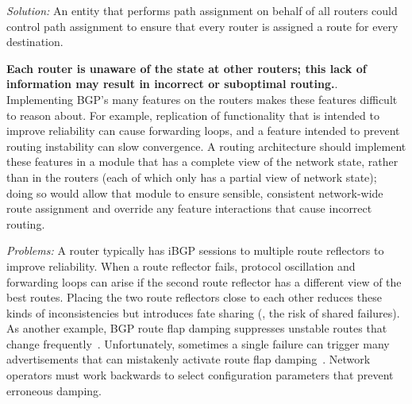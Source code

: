 \vspace{0.05in}
\noindent
{\em Solution:} 
An entity that performs path assignment on behalf of all
routers could control path assignment to ensure that every router is
assigned a route for every destination.
\vspace{0.05in}

{\bf Each router is unaware of the state at other routers; this lack of
  information may result in incorrect or suboptimal routing.}.
  Implementing BGP's many features on the routers makes these features
  difficult to reason about.  For example, replication of functionality
  that is intended to
  improve reliability can cause forwarding loops, and a feature intended
  to prevent routing instability can slow convergence.  A routing
  architecture should implement these features in a 
  module that has
  a complete view of the network state, rather than in the routers
  (each of which only has a partial view of network state); doing so
  would allow that module to ensure sensible, consistent network-wide
  route assignment and override any feature interactions that cause
  incorrect routing. 

%
\vspace{0.05in}
\noindent
{\em Problems:} 
A router typically has iBGP sessions to multiple
route reflectors to improve reliability.  When a route reflector
fails, protocol oscillation and forwarding loops can arise if the
second route reflector has a different view of the best routes.
Placing the two route reflectors close to each other reduces these
kinds of inconsistencies but introduces fate sharing (\ie, the risk of
shared failures). 
As another example, BGP route flap damping suppresses
unstable routes that change frequently~\cite{rfc2439}.  Unfortunately,
sometimes a 
single failure can trigger many advertisements that can mistakenly
activate route flap damping~\cite{Mao2002}.  Network operators must work
backwards to select configuration parameters that prevent erroneous
damping.

